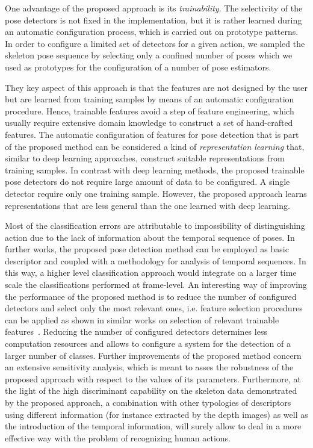 \documentclass[runningheads,a4paper]{llncs}
\begin{document}
One advantage of the proposed approach is its \emph{trainability}. The selectivity of the pose detectors is not fixed in the implementation, but it is rather learned during an automatic configuration process, which is carried out on prototype patterns. 
In order to configure a limited set of detectors for a given action, we sampled the skeleton pose sequence by selecting only a confined number of poses which we used as prototypes for the configuration of a number of pose estimators. 

They key aspect of this approach is that the features are not designed by the user but are learned from training samples by means of an automatic configuration procedure. Hence, trainable features avoid a step of feature engineering, which usually require extensive domain knowledge to construct a set of hand-crafted features. The automatic configuration of features for pose detection that is part of the proposed method can be considered a kind of \emph{representation learning} that, similar to deep learning approaches, construct suitable representations from training samples.
In contrast with deep learning methods, the proposed trainable pose detectors do not require large amount of data to be configured. A single detector require only one training sample. However, the proposed approach learns representations that are less general than the one learned with deep learning.

Most of the classification errors are attributable to impossibility of distinguishing action due to the lack of information about the temporal sequence of poses. In further works, the proposed pose detection method can be employed as basic descriptor and coupled with a methodology for analysis of temporal sequences. In this way, a higher level classification approach would integrate on a larger time scale the classifications performed at frame-level.
An interesting way of improving the performance of the proposed method is to reduce the number of configured detectors and select only the most relevant ones, i.e. feature selection procedures can be applied as shown in similar works on selection of relevant trainable features~\cite{Strisciuglio15,Strisciuglio2016}. Reducing the number of configured detectors determines less computation resources and allows to configure a system for the detection of a larger number of classes.
Further improvements of the proposed method concern an extensive sensitivity analysis, which is meant to asses the robustness of the proposed approach with respect to the values of its  parameters. Furthermore, at the light of the high discriminant capability on the skeleton data demonstrated by the proposed approach, a combination with other typologies of descriptors using different information (for instance extracted by the depth images) as well as the introduction of the temporal information, will surely allow to deal in a more effective way with the problem of recognizing human actions.
\end{document}
